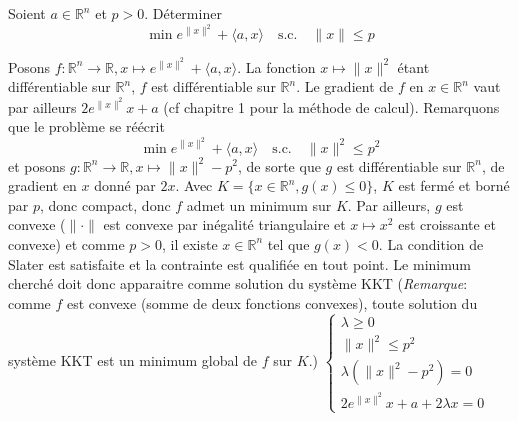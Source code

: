 \documentclass{fancybook}
\begin{document}
\begin{exercice}
Soient $a\in \mathbb R^n$ et $p>0$. Déterminer $$\min e^{\|x\|^2}+\langle a,x\rangle \quad \text{s.c.} \quad \|x\| \leq p$$
\end{exercice}
Posons $f:\mathbb R^n \to \mathbb R, x \mapsto e^{\|x\|^2}+\langle a,x\rangle$. La fonction $x\mapsto \|x\|^2$ étant différentiable sur $\mathbb R^n$, $f$ est différentiable sur $\mathbb R^n$. Le gradient de $f$ en $x\in \mathbb R^n$ vaut par ailleurs $2e^{\|x\|^2}x+a$ (cf chapitre 1 pour la méthode de calcul).\newline
Remarquons que le problème se réécrit $$\min e^{\|x\|^2}+\langle a,x\rangle \quad \text{s.c.} \quad \|x\|^2 \leq p^2$$ et posons $g:\mathbb R^n \to \mathbb R, x\mapsto \|x\|^2 - p^2$, de sorte que $g$ est différentiable sur $\mathbb R^n$, de gradient en $x$ donné par $2x$. \newline
\newline
Avec $K=\{x\in \mathbb R^n, g(x)\leq 0\}$, $K$ est fermé et borné par $p$, donc compact, donc $f$ admet un minimum sur $K$. \newline
Par ailleurs, $g$ est convexe ($\|\cdot\|$ est convexe par inégalité triangulaire et $x\mapsto x^2$ est croissante et convexe) et comme $p>0$, il existe $x\in \mathbb R^n$ tel que $g(x)<0$. La condition de Slater est satisfaite et la contrainte est qualifiée en tout point.\newline
\newline
Le minimum cherché doit donc apparaitre comme solution du système KKT (\textit{Remarque}: comme $f$ est convexe (somme de deux fonctions convexes), toute solution du système KKT est un minimum global de $f$ sur $K$.) \newline
$\begin{cases}
\lambda\geq 0 \\
\|x\|^2\leq p^2 \\
\lambda(\|x\|^2-p^2)=0 \\
2e^{\|x\|^2}x+a+2\lambda x =0
\end{cases}$\newline
\end{document}
